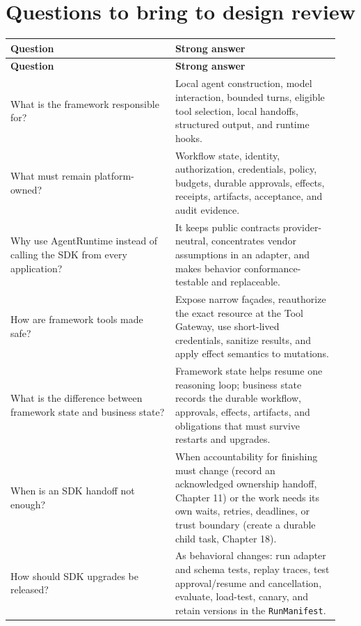 \section{Questions to bring to design review}

\BookTableStart
\small
\begin{longtable}{@{}Y{0.4700\linewidth}Y{0.4700\linewidth}@{}}
\color{white}\bfseries \textbf{Question} & \color{white}\bfseries \textbf{Strong answer} \\
\endfirsthead
{}
\color{white}\bfseries \textbf{Question} & \color{white}\bfseries \textbf{Strong answer} \\
\endhead
What is the framework responsible for? & Local agent construction, model interaction, bounded turns, eligible tool selection, local handoffs, structured output, and runtime hooks. \\
What must remain platform-owned? & Workflow state, identity, authorization, credentials, policy, budgets, durable approvals, effects, receipts, artifacts, acceptance, and audit evidence. \\
Why use AgentRuntime instead of calling the SDK from every application? & It keeps public contracts provider-neutral, concentrates vendor assumptions in an adapter, and makes behavior conformance-testable and replaceable. \\
How are framework tools made safe? & Expose narrow façades, reauthorize the exact resource at the Tool Gateway, use short-lived credentials, sanitize results, and apply effect semantics to mutations. \\
What is the difference between framework state and business state? & Framework state helps resume one reasoning loop; business state records the durable workflow, approvals, effects, artifacts, and obligations that must survive restarts and upgrades. \\
When is an SDK handoff not enough? & When accountability for finishing must change (record an acknowledged ownership handoff, Chapter 11) or the work needs its own waits, retries, deadlines, or trust boundary (create a durable child task, Chapter 18). \\
How should SDK upgrades be released? & As behavioral changes: run adapter and schema tests, replay traces, test approval/resume and cancellation, evaluate, load-test, canary, and retain versions in the \lstinline[style=bookinline]!RunManifest!. \\
\end{longtable}
\BookTableEnd

